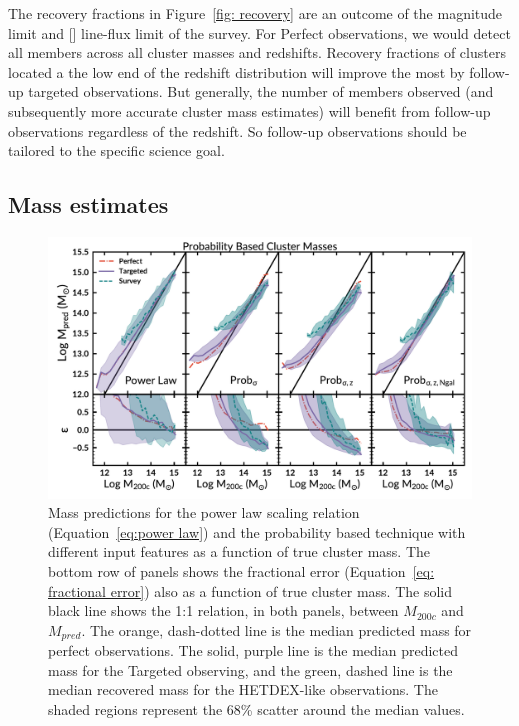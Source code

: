 \documentclass[fleqn,usenatbib]{mnras}
\begin{document}
The recovery fractions in Figure~\ref{fig: recovery} are an outcome of the magnitude limit and \hbox{[]} line-flux limit of the survey. For Perfect observations, we would detect all members across all cluster masses and redshifts. Recovery fractions of clusters located a the low end of the redshift distribution will improve the most by follow-up targeted observations. But generally, the number of members observed (and subsequently more accurate cluster mass estimates) will benefit from follow-up observations regardless of the redshift. So follow-up observations should be tailored to the specific science goal.

\subsection{Mass estimates}
\begin{figure} 
	\includegraphics[width=\textwidth]{figures/Probcomparison.pdf} 
	\caption[Probability based cluster mass predictions.]{Mass predictions for the power law scaling relation (Equation~\ref{eq:power law}) and the probability based technique with different input features as a function of true cluster mass. The bottom row of panels shows the fractional error (Equation~\ref{eq: fractional error}) also as a function of true cluster mass. The solid black line shows the 1:1 relation, in both panels, between $M_{200c}$ and $M_{pred}$. The orange, dash-dotted line is the median predicted mass for perfect observations. The solid, purple line is the median predicted mass for the Targeted observing, and the green, dashed line is the median recovered mass for the HETDEX-like observations. The shaded regions represent the 68\% scatter around the median values.}
	\label{fig:Probability comparison} 
\end{figure}
\end{document}
